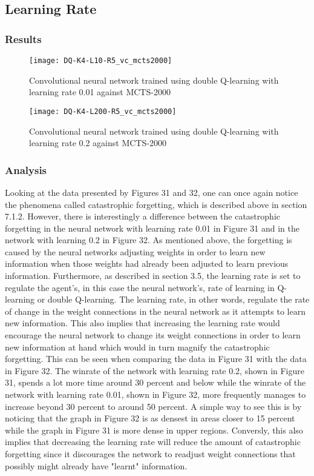 \documentclass[titlepage]{article}
\begin{document}
\subsection{Learning Rate}

\subsubsection{Results}

\begin{figure}[h]
    \center
    \texttt{[image: DQ-K4-L10-R5\_vc\_mcts2000]}
    \caption{Convolutional neural network trained using double Q-learning with learning rate 0.01 against MCTS-2000}
\end{figure}

\newpage

\begin{figure}[h]
    \center
    \texttt{[image: DQ-K4-L200-R5\_vc\_mcts2000]}
    \caption{Convolutional neural network trained using double Q-learning with learning rate 0.2 against MCTS-2000}
\end{figure}

\subsubsection{Analysis}

\vskip 0.2cm

Looking at the data presented by Figures 31 and 32, one can once again notice the phenomena called catastrophic forgetting, which is described above in section 7.1.2. However, there is interestingly a difference between the catastrophic forgetting in the neural network with learning rate 0.01 in Figure 31 and in the network with learning 0.2 in Figure 32. As mentioned above, the forgetting is caused by the neural networks adjusting weights in order to learn new information when those weights had already been adjusted to learn previous information. Furthermore, as described in section 3.5, the learning rate is set to regulate the agent's, in this case the neural network's, rate of learning in Q-learning or double Q-learning. The learning rate, in other words, regulate the rate of change in the weight connections in the neural network as it attempts to learn new information. This also implies that increasing the learning rate would encourage the neural network to change its weight connections in order to learn new information at hand which would in turn magnify the catastrophic forgetting. This can be seen when comparing the data in Figure 31 with the data in Figure 32. The winrate of the network with learning rate 0.2, shown in Figure 31, spends a lot more time around 30 percent and below while the winrate of the network with learning rate 0.01, shown in Figure 32, more frequently manages to increase beyond 30 percent to around 50 percent. A simple way to see this is by noticing that the graph in Figure 32 is as densest in areas closer to 15 percent while the graph in Figure 31 is more dense in upper regions. Conversly, this also implies that decreasing the learning rate will reduce the amount of catastrophic forgetting since it discourages the network to readjust weight connections that possibly might already have "learnt" information.
\end{document}

